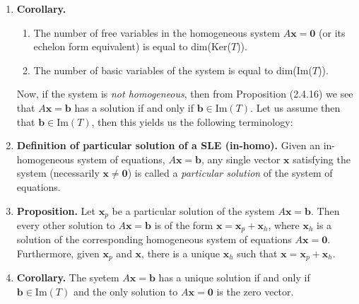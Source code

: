 \documentclass[oneside, 12pt]{book}
\newcommand{\settag}[1]{\renewcommand{\theenumi}{#1}}
\newcommand{\tbf}[1]{\textbf{#1}}
\newcommand{\tit}[1]{\textit{#1}}
\newcommand{\para}[1]{\item \tbf{#1}}
\newcommand{\vb}{\mathbf{b}}
\newcommand{\vx}{\mathbf{x}}
\begin{document}
\begin{enumerate}
        \settag{2.4.17}
        \para{Corollary.} 
        \begin{enumerate}
            \item The number of free variables in the homogeneous system $A\vx = \mathbf{0}$ (or its echelon form equivalent) is equal to dim(Ker($T$)).
            \item The number of basic variables of the system is equal to dim(Im($T$)).
        \end{enumerate}
        Now, if the system is \tit{not homogeneous}, then from Proposition (2.4.16) we see that $A\vx = \vb$ has a solution if and only if $\vb \in \text{Im}(T)$. Let us assume then that $\vb \in \text{Im}(T)$, then this yields us the following terminology:
        
        \settag{2.4.18}
        \para{Definition of particular solution of a SLE (in-homo).} Given an in-homogeneous system of equations, $A\vx = \vb$, any single vector $\vx$ satisfying the system (necessarily $\vx \neq \mathbf{0}$) is called a \tit{particular solution} of the system of equations.
        
        \settag{2.4.19}
        \para{Proposition.} Let $\vx_p$ be a particular solution of the system $A\vx = \vb$. Then every other solution to $A\vx = \vb$ is of the form $\vx = \vx_p + \vx_h$, where $\vx_h$ is a solution of the corresponding homogeneous system of equations $A\vx = \mathbf{0}$. Furthermore, given $\vx_p$ and $\vx$, there is a unique $\vx_h$ such that $\vx = \vx_p + \vx_h$.
        
        \settag{2.4.20}
        \para{Corollary.} The syetem $A\vx = \vb$ has a unique solution if and only if $\vb \in \text{Im}(T)$ and the only solution to $A\vx = \mathbf{0}$ is the zero vector.
    \end{enumerate}
    
\end{document}
